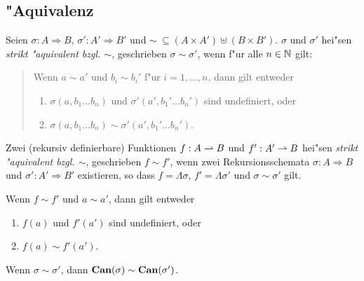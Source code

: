 \documentclass[12pt,a4paper]{article}
\begin{document}
\subsection{"Aquivalenz}

\begin{definition}
  Seien $\sigma:A \Rightarrow B$, $\sigma': A' \Rightarrow B'$ und $\sim\ \subseteq (A \times A') \uplus (B \times B')$.
  $\sigma$ und $\sigma'$ hei"sen \emph{strikt "aquivalent bzgl. $\sim$}, geschrieben $\sigma \sim \sigma'$,
  wenn f"ur alle $n \in \mathbb N$ gilt:
  \begin{quote}
    Wenn $a \sim a'$ und $b_i \sim b_i'$ f"ur $i=1,\ldots,n$, dann gilt entweder
    \begin{enumerate}
    \item $\sigma(a,b_1 \ldots b_n)$ und $\sigma'(a',b_1' \ldots b_n')$ sind undefiniert, oder
    \item $\sigma(a,b_1 \ldots b_n) \sim \sigma'(a',b_1' \ldots b_n')$.
    \end{enumerate}
  \end{quote}
  Zwei (rekursiv definierbare) Funktionen $f:A \rightharpoonup B$ und $f':A' \rightharpoonup B$ hei"sen
  \emph{strikt "aquivalent bzgl. $\sim$}, geschrieben $f \sim f'$, wenn zwei Rekursionsschemata
  $\sigma:A \Rightarrow B$ und $\sigma':A' \Rightarrow B'$ existieren, so dass $f = \Lambda \sigma$,
  $f' = \Lambda \sigma'$ und $\sigma \sim \sigma'$ gilt.
\end{definition}

\begin{corollary}
  Wenn $f \sim f'$ und $a \sim a'$, dann gilt entweder
  \begin{enumerate}
  \item $f(a)$ und $f'(a')$ sind undefiniert, oder
  \item $f(a) \sim f'(a')$.
  \end{enumerate}
\end{corollary}

\begin{corollary}
  Wenn $\sigma \sim \sigma'$, dann $\mathbf{Can}(\sigma) \sim \mathbf{Can}(\sigma')$.
\end{corollary}
\end{document}
